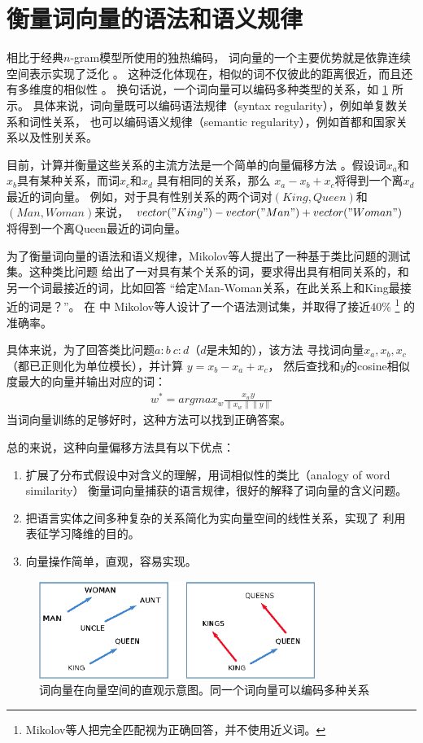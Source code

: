 \section{衡量词向量的语法和语义规律}
\label{sec:mea-syn-and-sem-reg}
相比于经典$n$-gram模型所使用的独热编码， 词向量的一个主要优势就是依靠连续空间表示实现了泛化
\cite{Bengio2006}。
这种泛化体现在，相似的词不仅彼此的距离很近，而且还有多维度的相似性
\cite{DBLP:conf/naacl/MikolovYZ13}。
换句话说，一个词向量可以编码多种类型的关系，如 \cref{fig:word-offsets} 所示。
具体来说，词向量既可以编码语法规律（syntax regularity），例如单复数关系和词性关系，
也可以编码语义规律（semantic regularity），例如首都和国家关系以及性别关系。

目前，计算并衡量这些关系的主流方法是一个简单的向量偏移方法
\cite{DBLP:conf/naacl/MikolovYZ13}。假设词$x_a$和$x_b$具有某种关系，而词$x_c$和$x_d$
具有相同的关系，那么 $x_a - x_b + x_c$将得到一个离$x_d$最近的词向量。
例如，对于具有性别关系的两个词对$(King, Queen)$和$(Man, Woman)$来说，
$vector("King") - vector("Man") + vector("Woman")$将得到一个离Queen最近的词向量。

为了衡量词向量的语法和语义规律，Mikolov等人提出了一种基于类比问题的测试集。这种类比问题
给出了一对具有某个关系的词，要求得出具有相同关系的，和另一个词最接近的词，比如回答
“给定Man-Woman关系，在此关系上和King最接近的词是？”。
在 \cite{DBLP:conf/naacl/MikolovYZ13}中
Mikolov等人设计了一个语法测试集，并取得了接近40\%
\footnote{Mikolov等人把完全匹配视为正确回答，并不使用近义词。}
的准确率。

具体来说，为了回答类比问题$a:b\  c:d$（$d$是未知的），该方法
寻找词向量$x_a,x_b,x_c$（都已正则化为单位模长），并计算 $y=x_b-x_a+x_c$，
然后查找和$y$的cosine相似度最大的向量并输出对应的词：
\begin{align*}
  w^{*} = argmax_w \frac{x_w y}{\lVert x_w \rVert \lVert y \rVert}
\end{align*}
当词向量训练的足够好时，这种方法可以找到正确答案。

总的来说，这种向量偏移方法具有以下优点：
\begin{enumerate}
  \item 扩展了分布式假设中对含义的理解，用词相似性的类比（analogy of word similarity）
    衡量词向量捕获的语言规律，很好的解释了词向量的含义问题。
  \item 把语言实体之间多种复杂的关系简化为实向量空间的线性关系，实现了
    利用表征学习降维的目的\cite{HinSal06}。
  \item 向量操作简单，直观，容易实现。
\end{enumerate}

\begin{figure}
  \includegraphics[width=0.8\textwidth]{figures/word-offsets.eps}
  \centering
  \caption{词向量在向量空间的直观示意图。同一个词向量可以编码多种关系
  \cite{DBLP:conf/naacl/MikolovYZ13}}
  \label{fig:word-offsets}
\end{figure}


